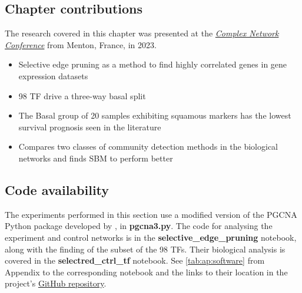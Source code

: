 \subsection{Chapter contributions}

The research covered in this chapter was presented at the \textit{\href{https://2023.complexnetworks.org/}{Complex Network Conference}} from Menton, France, in 2023.

\begin{itemize}
    \item Selective edge pruning as a method to find highly correlated genes in gene expression datasets 
    \item 98 TF drive a three-way basal split
    \item The Basal group of 20 samples exhibiting squamous markers has the lowest survival prognosis seen in the literature
    \item Compares two classes of community detection methods in the biological networks and finds SBM to perform better 
\end{itemize}

\subsection{Code availability}

The experiments performed in this section use a modified version of the PGCNA Python package developed by \citep{Care2019-ij}, in \textbf{pgcna3.py}. The code for analysing the experiment and control networks is in the \textbf{selective\_edge\_pruning} notebook, along with the finding of the subset of the 98 TFs. Their biological analysis is covered in the \textbf{selectred\_ctrl\_tf} notebook. See \cref{tab:ap:software} from Appendix to the corresponding notebook and the links to their location in the project's \href{https://github.com/vladUng/PhD_thesis_exp/}{GitHub repository}.


